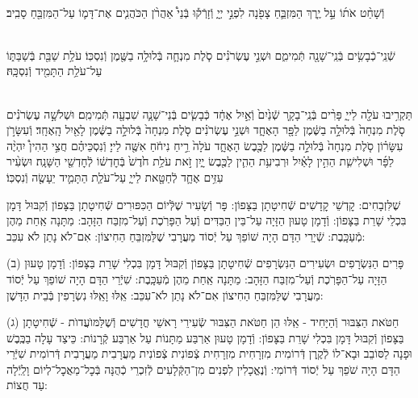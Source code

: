 \documentclass[twoside, openany, parskip=half, 11pt]{book}
\begin{document}
\\
וְֿשָׁחַ֨ט  אֹת֜וֹ עַ֣ל יֶ֧רֶךְ הַמִּזְבֵּ֛חַ צָפֹ֖נָה לִפְנֵ֣י יְיָ֑ וְֿזָרְֿק֡וּ בְּֿנֵי֩ אַהֲרֹ֨ן הַכֹּהֲנִ֧ים אֶת־דָּמ֛וֹ עַל־הַמִּזְבֵּ֖חַ סָבִֽיב׃

\shabbos\\
שְֿׁנֵֽי־כְֿבָשִׂ֥ים בְּֿנֵֽי־שָׁנָ֖ה תְּֿמִימִ֑ם וּשְׁנֵ֣י עֶשְׂרֹנִ֗ים סֹ֧לֶת מִנְחָ֛ה בְּֿלוּלָ֥ה בַשֶּׁ֖מֶן וְֿנִסְכּֽוֹ׃
עֹלַ֥ת שַׁבַּ֖ת בְּֿשַׁבַּתּ֑וֹ עַל־עֹלַ֥ת הַתָּמִ֖יד וְֿנִסְכָּֽהּ׃


\\
תַּקְרִ֥יבוּ עֹלָ֖ה לַייָ֑ פָּרִ֨ים בְּֿנֵֽי־בָקָ֤ר שְֿׁנַ֙יִם֙ וְֿאַ֣יִל אֶחָ֔ד כְּֿבָשִׂ֧ים בְּֿנֵי־שָׁנָ֛ה שִׁבְעָ֖ה תְּֿמִימִֽם׃
וּשְׁלֹשָׁ֣ה עֶשְׂרֹנִ֗ים סֹ֤לֶת מִנְחָה֙ בְּֿלוּלָ֣ה בַשֶּׁ֔מֶן לַפָּ֖ר הָאֶחָ֑ד וּשְׁנֵ֣י עֶשְׂרֹנִ֗ים סֹ֤לֶת מִנְחָה֙ בְּֿלוּלָ֣ה בַשֶּׁ֔מֶן לָאַ֖יִל הָֽאֶחָֽד׃
וְֿעִשָּׂרֹ֣ן עִשָּׂר֗וֹן סֹ֤לֶת מִנְחָה֙ בְּֿלוּלָ֣ה בַשֶּׁ֔מֶן לַכֶּ֖בֶשׂ הָאֶחָ֑ד עֹלָה֙ רֵ֣יחַ נִיחֹ֔חַ אִשֶּׁ֖ה לַייָ׃
וְֿנִסְכֵּיהֶ֗ם חֲצִ֣י הַהִין֩ יִהְיֶ֨ה לַפָּ֜ר וּשְׁלִישִׁ֧ת הַהִ֣ין לָאַ֗יִל וּרְבִיעִ֥ת הַהִ֛ין לַכֶּ֖בֶשׂ יָ֑יִן זֹ֣את עֹלַ֥ת חֹ֙דֶשׁ֙ בְּֿחׇדְשׁ֔וֹ לְֿחׇדְשֵׁ֖י הַשָּׁנָֽה׃
וּשְׂעִ֨יר עִזִּ֥ים אֶחָ֛ד לְֿחַטָּ֖את לַייָ֑ עַל־עֹלַ֧ת הַתָּמִ֛יד יֵעָשֶׂ֖ה וְֿנִסְכּֽוֹ׃



%
שֶׁלִּזְבָחִים: קׇדְשֵׁי קׇדָשִׁים שְֿׁחִיטָתָן בַּצָּפוֹן: פָּר וְֿשָׂעִיר שֶׁלְּֿיוֹם הַכִּפּוּרִים שְֿׁחִיטָתָן בַּצָּפוֹן וְֿקִבּוּל דָּמָן בִּכְלֵי שָׁרֵת בַּצָּפוֹן: וְֿדָמָן טָעוּן הַזָּיָה עַל־בֵּין הַבַּדִּים וְֿעַל הַפָּרֹֽכֶת וְֿעַל־מִזְבַּח הַזָּהָב: מַתָּנָה אַֽחַת מֵהֶן מְֿעַכָּֽבֶת: שְֿׁיָרֵי הַדָּם הָיָה שׁוֹפֵךְ עַל יְֿסוֹד מַעֲרָבִי שֶׁלַּמִּזְבֵּחַ הַחִיצוֹן: אִם־לֹא נָתַן לֹא עִכֵּב:

(ב) פָּרִים הַנִּשְׂרָפִים וּשְׂעִירִים הַנִּשְׂרָפִים שְֿׁחִיטָתָן בַּצָּפוֹן וְֿקִבּוּל דָּמָן בִּכְלִי שָׁרֵת בַּצָּפוֹן: וְֿדָמָן טָעוּן הַזָּיָה עַל־הַפָּרֹֽכֶת וְֿעַל־מִזְבַּח הַזָּהָב: מַתָּנָה אַֽחַת מֵהֶן מְֿעַכָּֽבֶת: שִׁיְֿרֵי הַדָּם הָיָה שׁוֹפֵךְ עַל יְֿסוֹד מַעֲרָבִי שֶׁלַּמִּזְבֵּחַ הַחִיצוֹן אִם־לֹא נָתַן לֹא־עִכֵּב: אֵֽלּוּ וָאֵֽלּוּ נִשְׂרָפִין בְּֿבֵית הַדָּשֶׁן:

(ג) חַטֹּאת הַצִּבּוּר וְֿהַיָּחִיד - אֵֽלּוּ הֵן חַטֹּאת הַצִּבּוּר שְֿׂעִירֵי רָאשֵׁי חֳדָשִׁים וְֿשֶׁלַּמּוׁעֲדוׂת - שְֿׁחִיטָתָן בַּצָּפוֹן וְֿקִבּוּל דָּמָן בִּכְלִי שָׁרֵת בַּצָּפוֹן: וְֿדָמָן טָעוּן אַרְבַּע מַתָּנוֹת עַל אַרְבַּע קְֿרָנוֹת: כֵּיצַד עָלָה בַכֶּֽבֶשׁ וּפָנָה לַסּוֹבֵב וּבָא־לוֹ לְֿקֶֽרֶן דְּֿרוֹמִית מִזְרָחִית מִזְרָחִית צְֿפוֹנִית צְֿפוֹנִית מַעֲרָבִית מַעֲרָבִית דְּֿרוֹמִית שִׁיְּֿרֵי הַדָּם הָיָה שֹׁפֵךְ עַל יְֿסוֹד דְּֿרוֹמִי: וְֿנֶאֱכָלִין לִפְנִים מִן־הַקְּֿלָעִים לְֿזִכְרֵי כְֿהֻנָּה בְּֿכׇל־מַאֲכׇל־לְיוֹם וָלַֽיְֿלָה עַד חֲצוֹת:
\end{document}
